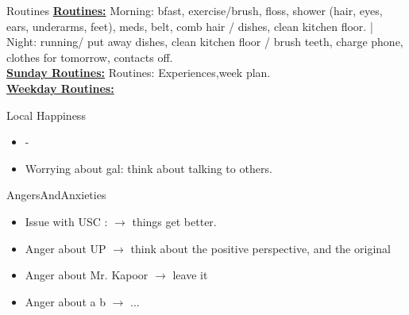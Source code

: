 \begin{columns}  %
  \begin{column}{0.20\linewidth}
    \begin{block}{Routines}
      { \tiny \underline{\bf Routines:} Morning: bfast, exercise/brush,
        floss, shower (hair, eyes, ears, underarms, feet), meds, belt,
        comb hair / dishes, clean kitchen floor. |  Night: running/ put
        away dishes, clean kitchen floor / brush teeth, charge phone,
        clothes for tomorrow, contacts off.}\\
      {\tiny \underline{\bf Sunday Routines:} Routines:
        Experiences,week plan.}\\ 
      {\tiny \underline{\bf Weekday Routines:}}\\
    \end{block} 
    \begin{block}{Local Happiness}
      \begin{itemize} 
        \tiny \item \tiny -
      \item \tiny Worrying about gal: think about talking to others.
      \end{itemize} 
    \end{block}
    \begin{block}{AngersAndAnxieties}
      \begin{itemize}
        \item \tiny Issue with USC : $\rightarrow$ things get better. 
        \tiny \item \tiny Anger about UP $\rightarrow$ think about the positive
        perspective, and the original
      \item \tiny Anger about Mr. Kapoor $\rightarrow$  leave it
      \item \tiny Anger about a b  $\rightarrow$ ...

\end{itemize}
\end{block}
\end{column}
\end{columns}

